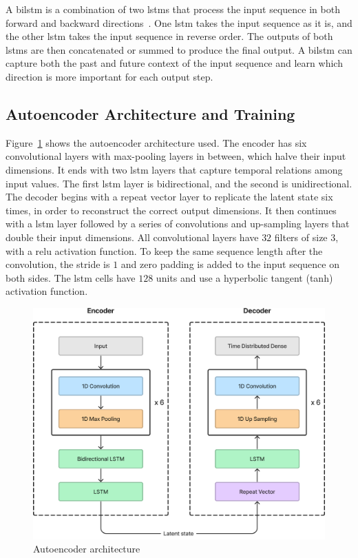 A \acrfull{bilstm} is a combination of two \acrshort{lstm}s that process the input sequence in both forward and backward directions~\parencite{schuster_bidirectional_1997}. One \acrshort{lstm} takes the input sequence as it is, and the other \acrshort{lstm} takes the input sequence in reverse order. The outputs of both \acrshort{lstm}s are then concatenated or summed to produce the final output. A \acrshort{bilstm} can capture both the past and future context of the input sequence and learn which direction is more important for each output step.

\subsection{Autoencoder Architecture and Training}

Figure~\ref{fig:autoencoder_architecture} shows the autoencoder architecture used. The encoder has six convolutional layers with max-pooling layers in between, which halve their input dimensions. It ends with two \acrshort{lstm} layers that capture temporal relations among input values. The first \acrshort{lstm} layer is bidirectional, and the second is unidirectional. The decoder begins with a repeat vector layer to replicate the latent state six times, in order to reconstruct the correct output dimensions. It then continues with a \acrshort{lstm} layer followed by a series of convolutions and up-sampling layers that double their input dimensions. All convolutional layers have $32$ filters of size $3$, with a \acrfull{relu} activation function. To keep the same sequence length after the convolution, the stride is $1$ and zero padding is added to the input sequence on both sides. The \acrshort{lstm} cells have $128$ units and use a hyperbolic tangent (tanh) activation function.

\begin{figure}
    \centering
    \includegraphics[width=.8\linewidth]{images/autoencoder.png}
    \caption{Autoencoder architecture}
    \label{fig:autoencoder_architecture}
\end{figure}

